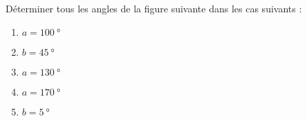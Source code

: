 
\begin{exercice}\label{exo2smath-0069}

    Déterminer tous les angles de la figure suivante dans les cas suivants :

\begin{center}
   
\end{center}

    \begin{multicols}{3}
        \begin{enumerate}
            \item
                \( a=\SI{100}{\degree}\) 
            \item
                \( b=\SI{45}{\degree}\) 
            \item
                \( a=\SI{130}{\degree}\) 
            \item
                \( a=\SI{170}{\degree}\) 
            \item
                \( b=\SI{5}{\degree}\) 
        \end{enumerate}
    \end{multicols}

\end{exercice}
